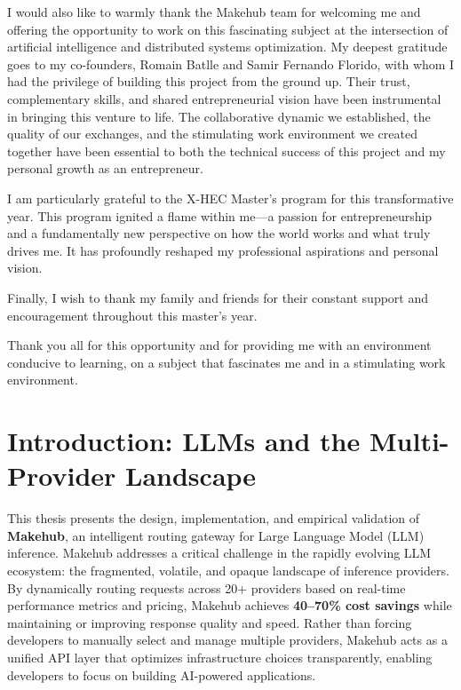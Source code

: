 \documentclass[english]{article}
\begin{document}
I would also like to warmly thank the Makehub team for welcoming me and offering the opportunity to work on this fascinating subject at the intersection of artificial intelligence and distributed systems optimization. My deepest gratitude goes to my co-founders, Romain Batlle and Samir Fernando Florido, with whom I had the privilege of building this project from the ground up. Their trust, complementary skills, and shared entrepreneurial vision have been instrumental in bringing this venture to life. The collaborative dynamic we established, the quality of our exchanges, and the stimulating work environment we created together have been essential to both the technical success of this project and my personal growth as an entrepreneur.

I am particularly grateful to the X-HEC Master's program for this transformative year. This program ignited a flame within me—a passion for entrepreneurship and a fundamentally new perspective on how the world works and what truly drives me. It has profoundly reshaped my professional aspirations and personal vision.

Finally, I wish to thank my family and friends for their constant support and encouragement throughout this master's year.

\bigskip

Thank you all for this opportunity and for providing me with an environment conducive to learning, on a subject that fascinates me and in a stimulating work environment.

\newpage
\tableofcontents
\newpage
\listoffigures

\newpage

\section{Introduction: LLMs and the Multi-Provider Landscape}

This thesis presents the design, implementation, and empirical validation of \textbf{Makehub}, an intelligent routing gateway for Large Language Model (LLM) inference. Makehub addresses a critical challenge in the rapidly evolving LLM ecosystem: the fragmented, volatile, and opaque landscape of inference providers. By dynamically routing requests across 20+ providers based on real-time performance metrics and pricing, Makehub achieves \textbf{40--70\% cost savings} while maintaining or improving response quality and speed. Rather than forcing developers to manually select and manage multiple providers, Makehub acts as a unified API layer that optimizes infrastructure choices transparently, enabling developers to focus on building AI-powered applications.
\end{document}
